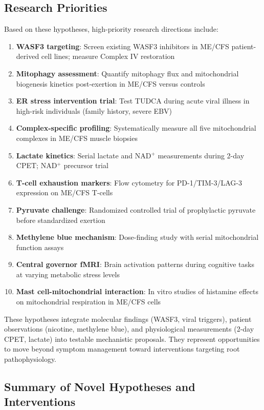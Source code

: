 \subsection{Research Priorities}
\label{subsec:research-priorities}

Based on these hypotheses, high-priority research directions include:

\begin{enumerate}
    \item \textbf{WASF3 targeting}: Screen existing WASF3 inhibitors in ME/CFS patient-derived cell lines; measure Complex IV restoration
    \item \textbf{Mitophagy assessment}: Quantify mitophagy flux and mitochondrial biogenesis kinetics post-exertion in ME/CFS versus controls
    \item \textbf{ER stress intervention trial}: Test TUDCA during acute viral illness in high-risk individuals (family history, severe EBV)
    \item \textbf{Complex-specific profiling}: Systematically measure all five mitochondrial complexes in ME/CFS muscle biopsies
    \item \textbf{Lactate kinetics}: Serial lactate and NAD$^+$ measurements during 2-day CPET; NAD$^+$ precursor trial
    \item \textbf{T-cell exhaustion markers}: Flow cytometry for PD-1/TIM-3/LAG-3 expression on ME/CFS T-cells
    \item \textbf{Pyruvate challenge}: Randomized controlled trial of prophylactic pyruvate before standardized exertion
    \item \textbf{Methylene blue mechanism}: Dose-finding study with serial mitochondrial function assays
    \item \textbf{Central governor fMRI}: Brain activation patterns during cognitive tasks at varying metabolic stress levels
    \item \textbf{Mast cell-mitochondrial interaction}: In vitro studies of histamine effects on mitochondrial respiration in ME/CFS cells
\end{enumerate}

These hypotheses integrate molecular findings (WASF3, viral triggers), patient observations (nicotine, methylene blue), and physiological measurements (2-day CPET, lactate) into testable mechanistic proposals. They represent opportunities to move beyond symptom management toward interventions targeting root pathophysiology.

\subsection{Summary of Novel Hypotheses and Interventions}
\label{subsec:novel-hypotheses-summary}

